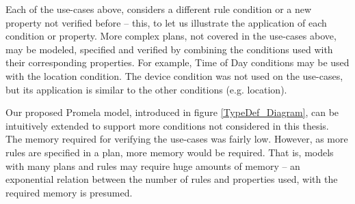 Each of the use-cases above, considers a different rule condition or a new property not verified before -- this, to let us illustrate the application of each condition or property. More complex plans, not covered in the use-cases above, may be modeled, specified and verified by combining the conditions used with their corresponding properties. For example, Time of Day conditions may be used with the location condition. The device condition was not used on the use-cases, but its application is similar to the other conditions (e.g. location). 

Our proposed Promela model, introduced in figure \ref{TypeDef_Diagram}, can be intuitively extended to support more conditions not considered in this thesis. \\

The memory required for verifying the use-cases was fairly low. However, as more rules are specified in a plan, more memory would be required. That is, models with many plans and rules may require huge amounts of memory -- an exponential relation between the number of rules and properties used, with the required memory is presumed. \\

\clearpage

